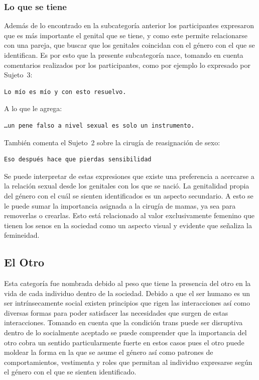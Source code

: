 \subsubsection{Lo que se tiene}

Además de lo encontrado en la subcategoría anterior los participantes expresaron
que es más importante el genital que se tiene, y como este permite relacionarse
con una pareja, que buscar que los genitales coincidan con el género con el que
se identifican. Es por esto que la presente subcategoría nace, tomando en cuenta
comentarios realizados por los participantes, como por ejemplo lo expresado por
Sujeto~3:

\begin{verbatim}
Lo mío es mío y con esto resuelvo.
\end{verbatim}

A lo que le agrega:

 \begin{verbatim}
…un pene falso a nivel sexual es solo un instrumento.
 \end{verbatim}

También comenta el Sujeto~2 sobre la cirugía de reasignación de sexo:

\begin{verbatim}
Eso después hace que pierdas sensibilidad
\end{verbatim}

Se puede interpretar de estas expresiones que existe una preferencia a acercarse
a la relación sexual desde los genitales con los que se nació. La genitalidad
propia del género con el cuál se sienten identificados es un aspecto secundario.
A esto se le puede sumar la importancia asignada a la cirugía de mamas, ya sea
para removerlas o crearlas. Esto está relacionado al valor exclusivamente
femenino que tienen los senos en la sociedad como un aspecto visual y evidente
que señaliza la femineidad.

\subsection{El Otro}

Esta categoría fue nombrada debido al peso que tiene la presencia del otro en
la vida de cada individuo dentro de la sociedad. Debido a que el ser humano es
un ser intrínsecamente social existen principios que rigen las interacciones así
como diversas formas para poder satisfacer las necesidades que surgen de estas
interacciones. Tomando en cuenta que la condición trans puede ser disruptiva
dentro de lo socialmente aceptado se puede comprender que la importancia del
otro cobra un sentido particularmente fuerte en estos casos pues el otro puede
moldear la forma en la que se asume el género así como patrones de
comportamientos, vestimenta y roles que permitan al individuo expresarse según
el género con el que se sienten identificado.

